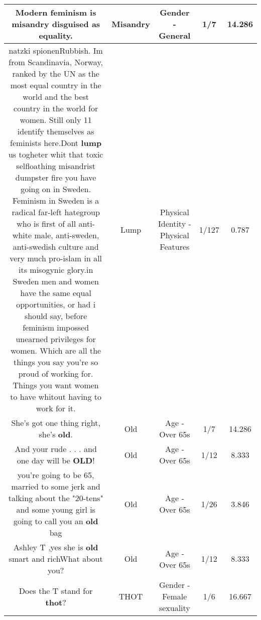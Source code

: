 \documentclass[11pt]{article}
\newlength\mylength
\begin{document}
\begin{center}
\begin{longtable}{|C{.65\mylength}|C{.30\mylength}|C{.12\mylength}|C{.12\mylength}|C{.12\mylength}|}
  \small Modern feminism is \textbf{misandry} disguised as equality.\normalsize   & Misandry & Gender - General & 1/7 & 14.286 \\  \hline
  \small natzki spionenRubbish. Im from Scandinavia, Norway, ranked by the UN as the most equal country in the world and the best country in the world for women. Still only 11 identify themselves as feminists here.Dont \textbf{lump} us togheter whit that toxic selfloathing misandrist dumpster fire you have going on in Sweden. Feminism in Sweden is a radical far-left hategroup who is first of all anti-white male, anti-sweden, anti-swedish culture and very much pro-islam in all its misogynic glory.in Sweden men and women have the same equal opportunities, or had i should say, before feminism impossed unearned privileges for women. Which are all the things you say you're so proud of working for. Things you want women to have whitout having to work for it.\normalsize   & Lump & Physical Identity - Physical Features & 1/127 & 0.787 \\  \hline
  \small She's got one thing right, she's \textbf{old}.\normalsize   & Old & Age - Over 65s & 1/7 & 14.286 \\  \hline
  \small And your rude . . . and one day will be \textbf{OLD}!\normalsize   & Old & Age - Over 65s & 1/12 & 8.333 \\  \hline
  \small you're going to be 65, married to some jerk and talking about the "20-tens" and some young girl is going to call you an \textbf{old} bag\normalsize   & Old & Age - Over 65s & 1/26 & 3.846 \\  \hline
  \small Ashley T ,yes she is \textbf{old} smart and richWhat about you?\normalsize   & Old & Age - Over 65s & 1/12 & 8.333 \\  \hline
  \small Does the T stand for \textbf{thot}?\normalsize   & THOT & Gender - Female sexuality & 1/6 & 16.667 \\  \hline

\end{longtable}
\end{center}
\end{document}
